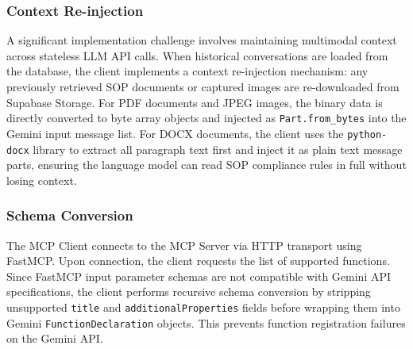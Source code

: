 \documentclass[conference]{IEEEtran}
\begin{document}
\subsubsection{Context Re-injection}
A significant implementation challenge involves maintaining multimodal context across stateless LLM API calls. When historical conversations are loaded from the database, the client implements a context re-injection mechanism: any previously retrieved SOP documents or captured images are re-downloaded from Supabase Storage. For PDF documents and JPEG images, the binary data is directly converted to byte array objects and injected as \texttt{Part.from\_bytes} into the Gemini input message list. For DOCX documents, the client uses the \texttt{python-docx} library to extract all paragraph text first and inject it as plain text message parts, ensuring the language model can read SOP compliance rules in full without losing context.

\subsubsection{Schema Conversion}
The MCP Client connects to the MCP Server via HTTP transport using FastMCP. Upon connection, the client requests the list of supported functions. Since FastMCP input parameter schemas are not compatible with Gemini API specifications, the client performs recursive schema conversion by stripping unsupported \texttt{title} and \texttt{additionalProperties} fields before wrapping them into Gemini \texttt{FunctionDeclaration} objects. This prevents function registration failures on the Gemini API.
\end{document}
